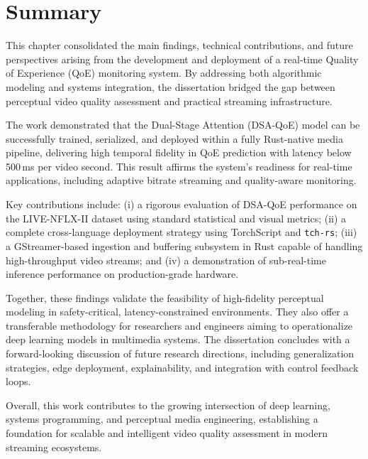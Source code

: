 \section{Summary}

This chapter consolidated the main findings, technical contributions, and future perspectives arising from the development and deployment of a real-time Quality of Experience (QoE) monitoring system. By addressing both algorithmic modeling and systems integration, the dissertation bridged the gap between perceptual video quality assessment and practical streaming infrastructure.

The work demonstrated that the Dual-Stage Attention (DSA-QoE) model can be successfully trained, serialized, and deployed within a fully Rust-native media pipeline, delivering high temporal fidelity in QoE prediction with latency below 500\,ms per video second. This result affirms the system’s readiness for real-time applications, including adaptive bitrate streaming and quality-aware monitoring.

Key contributions include: (i) a rigorous evaluation of DSA-QoE performance on the LIVE-NFLX-II dataset using standard statistical and visual metrics; (ii) a complete cross-language deployment strategy using TorchScript and \texttt{tch-rs}; (iii) a GStreamer-based ingestion and buffering subsystem in Rust capable of handling high-throughput video streams; and (iv) a demonstration of sub-real-time inference performance on production-grade hardware.

Together, these findings validate the feasibility of high-fidelity perceptual modeling in safety-critical, latency-constrained environments. They also offer a transferable methodology for researchers and engineers aiming to operationalize deep learning models in multimedia systems. The dissertation concludes with a forward-looking discussion of future research directions, including generalization strategies, edge deployment, explainability, and integration with control feedback loops.

Overall, this work contributes to the growing intersection of deep learning, systems programming, and perceptual media engineering, establishing a foundation for scalable and intelligent video quality assessment in modern streaming ecosystems.
